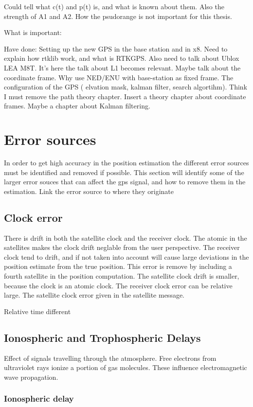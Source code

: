 Could tell what c(t) and p(t) is, and what is known about them. Also the strength of A1 and A2. How the psudorange is not important for this thesis.

What is important:

Have done: Setting up the new GPS in the base station and in x8. Need to explain how rtklib work, and what is RTKGPS. Also need to talk about Ublox LEA M8T. It's here the talk about L1 becomes relevant. Maybe talk about the coordinate frame. Why use NED/ENU with base-station as fixed frame. The configuration of the GPS ( elvation mask, kalman filter, search algortihm). Think I must remove the path theory chapter. Insert a theory chapter about coordinate frames. Maybe a chapter about Kalman filtering.
 
\section{Error sources}
In order to get high accuracy in the position estimation the different error sources must be identified and removed if possible. This section will identify some of the larger error souces that can affect the gps signal, and how to remove them in the estimation.
Link the error source to where they originate
\subsection{Clock error}
There is drift in both the satellite clock and the receiver clock. The atomic in the satellites makes the clock drift neglable from the user perspective. The receiver clock tend to drift, and if not taken into account will cause large deviations in the position estimate from the true position. This error is remove by including a fourth satellite in the position computation.  The satellite clock drift is smaller, because the clock is an atomic clock. The receiver clock error can be relative large. The satellite clock error given in the satellite message. 

Relative time different
\subsection{Ionospheric and Trophospheric Delays}
Effect of signals travelling through the atmosphere. Free electrons from ultraviolet rays ionize a portion of gas molecules. These influence electromagnetic wave propagation.
\subsubsection{Ionospheric delay}
